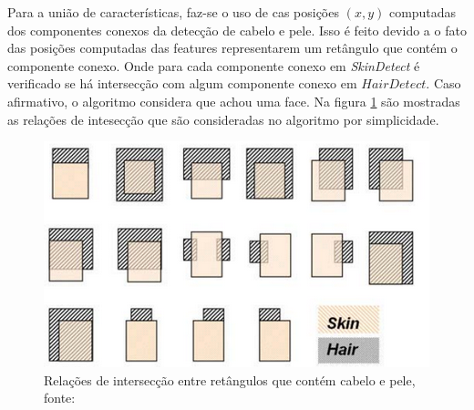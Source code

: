 \documentclass[journal,onecolumn]{IEEEtran}
\begin{document}
	Para a união de características, faz-se o uso de cas posições $(x,y)$ computadas dos componentes conexos da detecção de cabelo e pele.
	Isso é feito devido a o fato das posições computadas das features representarem um retângulo que contém o componente conexo.
	Onde para cada componente conexo em \textit{SkinDetect} é verificado se há intersecção com algum componente conexo em $HairDetect$.
	Caso afirmativo, o algoritmo considera que achou uma face.
	Na figura \ref{fig:intesectRelations} são mostradas as relações de intesecção que são consideradas no algoritmo por simplicidade.
	\begin{figure}[htp]
	\begin{center}
		\includegraphics[scale=0.3]{intersections_skin_hair_components.png}
		\caption{Relações de intersecção entre retângulos que contém cabelo e pele, fonte:\cite{chen2007simple} }			\label{fig:intesectRelations}
	\end{center}
	\end{figure}
	
	
	


\end{document}
